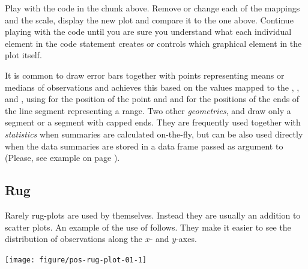 \documentclass[krantz2]{krantz}\usepackage{knitr}%
\begin{document}
\begin{playground}
Play with the code in the chunk above. Remove or change each of the mappings and the scale, display the new plot and compare it to the one above. Continue playing with the code until you are sure you understand what each individual element in the code statement creates or controls which graphical element in the plot itself.
\end{playground}

It is common to draw error bars together with points representing means or medians of observations and  achieves this based on the values mapped to the , ,  and , using  for the position of the point and  and  for the positions of the ends of the line segment representing a range. Two other \emph{geometries},  and   draw only a segment or a segment with capped ends. They are frequently used together with \emph{statistics} when summaries are calculated on-the-fly, but can be also used directly when the data summaries are stored in a data frame passed as argument to  (Please, see example on page \pageref{exmpl:plot:errorbar:precalc}).

\subsection{Rug}\label{sec:plot:rug}

Rarely rug-plots are used by themselves. Instead they are usually an addition to
scatter plots. An example of the use of  follows. They make it easier to see the distribution of observations
along the $x$- and $y$-axes.

\begin{knitrout}\footnotesize
{}\color{fgcolor}\begin{kframe}
\begin{alltt}
\hlstd{(} 
       \hlstd{(}     \hlstd{=}  \hlopt{+}
  \hlstd{()} \hlopt{+}
  \hlstd{()}
\end{alltt}
\end{kframe}

{\centering \texttt{[image: figure/pos-rug-plot-01-1]} 

}



\end{knitrout}
\end{document}
